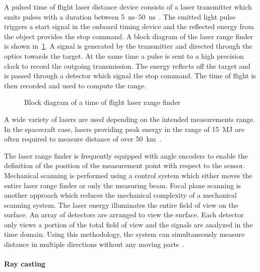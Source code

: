 \documentclass[letterpaper, paper,11pt]{AAS}		%
\begin{document}
A pulsed time of flight laser distance device consists of a laser transmitter which emits pulses with a duration between \SIrange{5}{50}{\nano\second}~\cite{amann2001}.
The emitted light pulse triggers a start signal in the onboard timing device and the reflected energy from the object provides the stop command.
A block diagram of the laser range finder is shown in~\cref{fig:lidar_block_diagram}.
A signal is generated by the transmitter and directed through the optics towards the target. 
At the same time a pulse is sent to a high precision clock to record the outgoing transmission. 
The energy reflects off the target and is passed through a detector which signal the stop command. 
The time of flight is then recorded and used to compute the range.
\begin{figure}[htbp]
    \centering
    
    \caption{ Block diagram of a time of flight laser range finder\label{fig:lidar_block_diagram}}
\end{figure}
A wide variety of lasers are used depending on the intended measurements range.
In the spacecraft case, lasers providing peak energy in the range of \SI{15}{\mega\joule} are often required to measure distance of over \SI{50}{\kilo\meter}~\cite{berry2013}.

The laser range finder is frequently equipped with angle encoders to enable the definition of the position of the measurement point with respect to the sensor. 
Mechanical scanning is performed using a control system which  either moves the entire laser range finder or only the measuring beam.
Focal plane scanning is another approach which reduces the mechanical complexity of a mechanical scanning system.
The laser energy illuminates the entire field of view on the surface.
An array of detectors are arranged to view the surface.
Each detector only views a portion of the total field of view and the signals are analyzed in the time domain.
Using this methodology, the system can simultaneously measure distance in multiple directions without any moving parts~\cite{amann2001}.

\paragraph{Ray casting}
\end{document}
